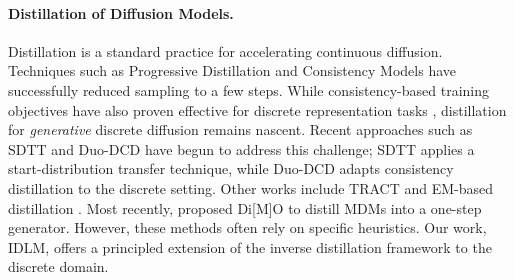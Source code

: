 \paragraph{Distillation of Diffusion Models.}
Distillation is a standard practice for accelerating continuous diffusion. Techniques such as Progressive Distillation \citep{salimans2022progressive} and Consistency Models
\citep{song2023consistency, kim2023consistency} have successfully reduced sampling to a few steps.
While consistency-based training objectives have also proven effective for discrete representation tasks \citep{consistency2024rep}, distillation for \textit{generative} discrete diffusion remains nascent.
Recent approaches such as SDTT \citep{deschenaux2024beyond} and Duo-DCD \citep{sahoo2025the} have begun to address this challenge; SDTT applies a start-distribution transfer technique, while Duo-DCD adapts consistency distillation to the discrete setting. Other works include TRACT \citep{berthelot2023tract} and EM-based distillation \citep{xie2024distillation}. Most recently, \citet{zhu_dimathttmo_2025} proposed Di[M]O to distill MDMs into a one-step generator. However, these methods often rely on specific heuristics. Our work, IDLM, offers a principled extension of the inverse distillation framework \citep{gushchin2025inverse, kornilov2025universal} to the discrete domain.

